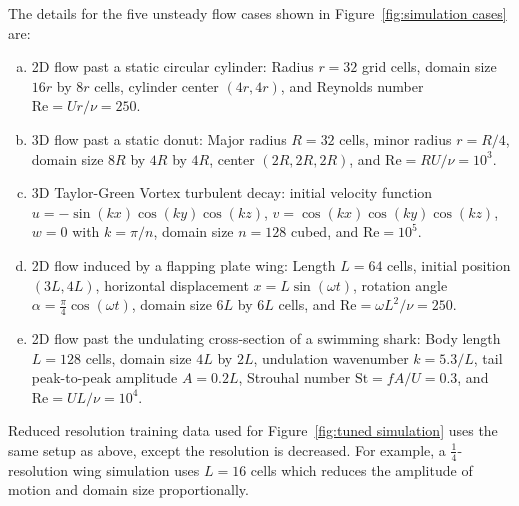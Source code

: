\documentclass[]{elsarticle}
\begin{document}
The details for the five unsteady flow cases shown in Figure~\ref{fig:simulation cases} are:
\begin{enumerate}[(a)]
    \item 2D flow past a static circular cylinder: Radius $r=32$ grid cells, domain size $16r$ by $8r$ cells, cylinder center $(4r,4r)$, and Reynolds number $\text{Re}=Ur/\nu=250$.
    \item 3D flow past a static donut: Major radius $R=32$ cells, minor radius $r=R/4$, domain size $8R$ by $4R$ by $4R$, center $(2R,2R,2R)$, and $\text{Re} = RU/\nu=10^3$.
    \item 3D Taylor-Green Vortex turbulent decay: initial velocity function $u=-\sin(kx)\cos(ky)\cos(kz)$, $v=\cos(kx)\cos(ky)\cos(kz)$, $w=0$ with $k=\pi/n$, domain size $n=128$ cubed, and $\text{Re}=10^5$.
    \item 2D flow induced by a flapping plate wing: Length $L=64$ cells, initial position $(3L,4L)$, horizontal displacement $x=L\sin(\omega t)$, rotation angle $\alpha=\frac\pi 4\cos(\omega t)$, domain size $6L$ by $6L$ cells, and $\text{Re}=\omega L^2/\nu=250$.
    \item 2D flow past the undulating cross-section of a swimming shark: Body length $L=128$ cells, domain size $4L$ by $2L$, undulation wavenumber $k=5.3/L$, tail peak-to-peak amplitude $A=0.2L$, Strouhal number $\text{St}=fA/U=0.3$, and $\text{Re}=UL/\nu=10^4$.
\end{enumerate}
Reduced resolution training data used for Figure~\ref{fig:tuned simulation} uses the same setup as above, except the resolution is decreased. For example, a $\frac 14$-resolution wing simulation uses $L=16$ cells which reduces the amplitude of motion and domain size proportionally.
\end{document}
